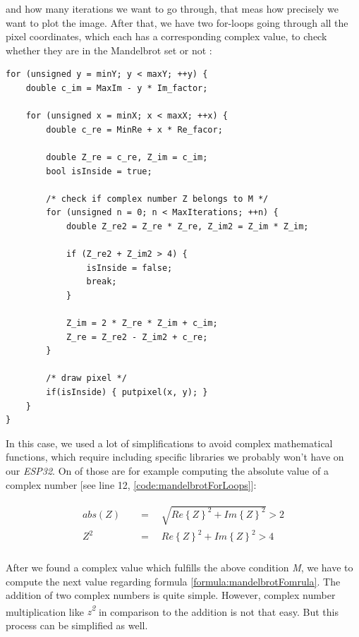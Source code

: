 and how many iterations we want to go through, that meas how precisely we want to plot the image. After that, we have two for-loops going through all the pixel coordinates, which each has a corresponding complex value, to check whether they are in the Mandelbrot set or not \parencite{internet15}:

\begin{lstlisting}[label={code:mandelbrotForLoops}]
for (unsigned y = minY; y < maxY; ++y) {
	double c_im = MaxIm - y * Im_factor;

	for (unsigned x = minX; x < maxX; ++x) {
		double c_re = MinRe + x * Re_facor;

		double Z_re = c_re, Z_im = c_im;
		bool isInside = true;

		/* check if complex number Z belongs to M */
		for (unsigned n = 0; n < MaxIterations; ++n) {
			double Z_re2 = Z_re * Z_re, Z_im2 = Z_im * Z_im;

			if (Z_re2 + Z_im2 > 4) {
				isInside = false;
				break;
			}

			Z_im = 2 * Z_re * Z_im + c_im;
			Z_re = Z_re2 - Z_im2 + c_re;
		}
		
		/* draw pixel */
		if(isInside) { putpixel(x, y); }
	}
}
\end{lstlisting}

\newpage

\noindent In this case, we used a lot of simplifications to avoid complex mathematical functions, which require including specific libraries we probably won't have on our \textit{ESP32}. On of those are for example computing the absolute value of a complex number [see line 12, \ref{code:mandelbrotForLoops}]:

\begin{align} \label{formula:simplicityOne}
	\begin{aligned}
		abs(Z) \quad &= \quad \sqrt{Re\left\lbrace Z \right\rbrace^2 + Im\left\lbrace Z \right\rbrace^2} > 2\\
		Z^2 \quad &= \quad Re\left\lbrace Z \right\rbrace^2 + Im\left\lbrace Z \right\rbrace^2 > 4
	\end{aligned}
\end{align}\\ 

After we found a complex value which fulfills the above condition \textit{M}, we have to compute the next value regarding formula \ref{formula:mandelbrotFomrula}. The addition of two complex numbers is quite simple. However, complex number multiplication like \textit{z\textsuperscript{2}} in comparison to the addition is not that easy. But this process can  be simplified as well.

